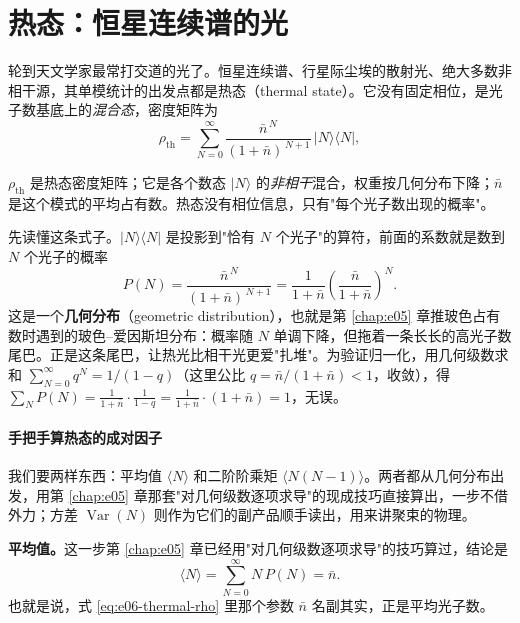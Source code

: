 \section{热态：恒星连续谱的光}
\label{sec:e06-thermal}

轮到天文学家最常打交道的光了。恒星连续谱、行星际尘埃的散射光、绝大多数非相干源，其单模统计的出发点都是热态（thermal state）。它没有固定相位，是光子数基底上的\emph{混合态}，密度矩阵为
\begin{equation}
  \rho_{\text{th}}=\sum_{N=0}^{\infty}
  \frac{\bar n^{\,N}}{(1+\bar n)^{\,N+1}}\,|N\rangle\langle N|,
  \label{eq:e06-thermal-rho}
\end{equation}
\begin{formulaexplain}
\(\rho_{\text{th}}\) 是热态密度矩阵；它是各个数态 \(|N\rangle\) 的\emph{非相干}混合，权重按几何分布下降；\(\bar n\) 是这个模式的平均占有数。热态没有相位信息，只有"每个光子数出现的概率"。
\end{formulaexplain}

先读懂这条式子。\(|N\rangle\langle N|\) 是投影到"恰有 \(N\) 个光子"的算符，前面的系数就是数到 \(N\) 个光子的概率
\[
  P(N)=\frac{\bar n^{\,N}}{(1+\bar n)^{\,N+1}}
  =\frac{1}{1+\bar n}\left(\frac{\bar n}{1+\bar n}\right)^{N}.
\]
这是一个\textbf{几何分布}（geometric distribution），也就是第 \ref{chap:e05} 章推玻色占有数时遇到的玻色--爱因斯坦分布：概率随 \(N\) 单调下降，但拖着一条长长的高光子数尾巴。正是这条尾巴，让热光比相干光更爱"扎堆"。为验证归一化，用几何级数求和 \(\sum_{N=0}^\infty q^N=1/(1-q)\)（这里公比 \(q=\bar n/(1+\bar n)<1\)，收敛），得 \(\sum_N P(N)=\frac{1}{1+\bar n}\cdot\frac{1}{1-q}=\frac{1}{1+\bar n}\cdot(1+\bar n)=1\)，无误。

\paragraph{手把手算热态的成对因子}
\label{sec:e06-thermal-b2}

我们要两样东西：平均值 \(\langle N\rangle\) 和二阶阶乘矩 \(\langle N(N-1)\rangle\)。两者都从几何分布出发，用第 \ref{chap:e05} 章那套"对几何级数逐项求导"的现成技巧直接算出，一步不借外力；方差 \(\operatorname{Var}(N)\) 则作为它们的副产品顺手读出，用来讲聚束的物理。

\textbf{平均值。}这一步第 \ref{chap:e05} 章已经用"对几何级数逐项求导"的技巧算过，结论是
\[
  \langle N\rangle=\sum_{N=0}^{\infty}N\,P(N)=\bar n.
\]
也就是说，式 \eqref{eq:e06-thermal-rho} 里那个参数 \(\bar n\) 名副其实，正是平均光子数。

